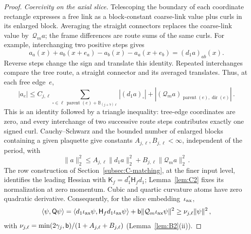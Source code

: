 \begin{proof}
\emph{Coercivity on the axial slice.} Telescoping the boundary of each coordinate rectangle expresses a free link as a block-constant coarse-link value plus curls in its enlarged block. Averaging the straight connectors replaces the coarse-link value by~$\mathcal Q_ma$; the frame differences are route sums of the same curls. For example, interchanging two positive steps gives
\begin{equation*}
a_a(x)+a_b(x+e_a)-a_b(x)-a_a(x+e_b)=(d_1a)_{ab}(x).
\end{equation*}
Reverse steps change the sign and translate this identity. Repeated interchanges compare the tree route, a straight connector and its averaged translates. Thus, at each free edge~$e$,
\begin{equation*}
|a_e|\le C_{j,\ell}\sum_{\square\in\ell\,\operatorname{parent}(e)+\mathbb B_{(j+7)\ell}}|(d_1a)_\square|
+|(\mathcal Q_ma)_{\operatorname{parent}(e),\operatorname{dir}(e)}|\,.
\end{equation*}
This is an identity followed by a triangle inequality: tree-edge coordinates are zero, and every interchange of two successive route steps contributes exactly one signed curl. Cauchy--Schwarz and the bounded number of enlarged blocks containing a given plaquette give constants $A_{j,\ell},B_{j,\ell}<\infty$, independent of the period, with
\begin{equation*}
\|a\|_2^2\le A_{j,\ell}\|d_1a\|_2^2+B_{j,\ell}\|\mathcal Q_ma\|_2^2\,.
\end{equation*}
The row construction of Section~\ref{subsec:C-matching}, at the finer input level, identifies the leading Hessian with $\mathsf K_f=d_1^*\mathsf H_fd_1$; Lemma~\ref{lem:C2} fixes its normalization at zero momentum. Cubic and quartic curvature atoms have zero quadratic derivative. Consequently, for the slice embedding~$\iota_{\rm ax}$,
\begin{equation*}
\langle \psi,\mathsf Q\psi\rangle
=\langle d_1\iota_{\rm ax}\psi,\mathsf H_f d_1\iota_{\rm ax}\psi\rangle
+\mathsf{b}\|\mathcal Q_m\iota_{\rm ax}\psi\|^2\ge\nu_{j,\ell}\|\psi\|^2\,,
\end{equation*}
with $\nu_{j,\ell}=\min(2\gamma_j,\mathsf{b})/(1+A_{j,\ell}+B_{j,\ell})$ (Lemma~\ref{lem:B2}(ii)).


\end{proof}
